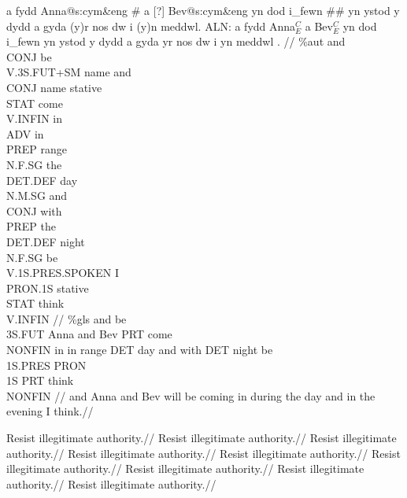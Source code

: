 \documentclass[12pt]{article}
\begin{document}
\ex
\def\suffdot#1{{\scriptsize .#1}}%
\begingl
a fydd Anna@s:cym\&eng \# a [?] Bev@s:cym\&eng yn dod i\_fewn \#\# yn
   ystod y dydd a gyda (y)r nos dw i (y)n meddwl.
\gla ALN:  a fydd Anna$^{C}_{E}$ a Bev$^{C}_{E}$ yn dod i\_fewn yn
   ystod y dydd a gyda yr nos dw i yn meddwl .  //
\glb \%aut  and\\{CONJ} be\\{V.3S.FUT+SM} name and\\{CONJ} name
   stative\\{STAT} come\\{V.INFIN} in\\{ADV} in\\{PREP}
   range\\{N.F.SG} the\\{DET.DEF} day\\{N.M.SG} and\\{CONJ}
   with\\{PREP} the\\{DET.DEF} night\\{N.F.SG} be\\{V.1S.PRES.SPOKEN}
   I\\{PRON.1S} stative\\{STAT} think\\{V.INFIN}   //
\glb \%gls  and be\\{3S.FUT} Anna and Bev PRT come\\{NONFIN} in in
   range DET day and with DET night be\\{1S.PRES} PRON\\{1S} PRT
   think\\{NONFIN}   //
\glft and Anna and Bev will be coming in during the day and in the
   evening I think.//
\endgl
\xe

\begingroup
{}

\ex
\begingl
\gla Resist illegitimate authority.//
\glb Resist illegitimate authority.//
\glc Resist illegitimate authority.//
\gld Resist illegitimate authority.//
\gle Resist illegitimate authority.//
\gld Resist illegitimate authority.//
\glc Resist illegitimate authority.//
\glb Resist illegitimate authority.//
\glf Resist illegitimate authority.//
\endgl
\xe
\end{document}
